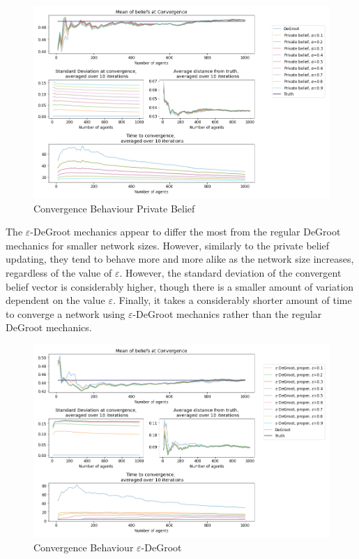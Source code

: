 \documentclass{article}
\begin{document}
\begin{center}
    \begin{figure}[!htbp]
        \centering
        \includegraphics[width=1.2\textwidth]{ThesisKI/Images/WisdomPrivate.png}
        \caption{Convergence Behaviour Private Belief}
        \label{network:noncoop}
    \end{figure}
\end{center}

\newpage

The $\varepsilon$-DeGroot mechanics appear to differ the most from the regular DeGroot mechanics for smaller network sizes. However, similarly to the private belief updating, they tend to behave more and more alike as the network size increases, regardless of the value of $\varepsilon$. However, the standard deviation of the convergent belief vector is considerably higher, though there is a smaller amount of variation dependent on the value $\varepsilon$. Finally, it takes a considerably shorter amount of time to converge a network using $\varepsilon$-DeGroot mechanics rather than the regular DeGroot mechanics. 

\begin{center}
    \begin{figure}[!htbp]
        \centering
        \includegraphics[width=1.2\textwidth]{ThesisKI/Images/WisdomEDeGroot.png}
        \caption{Convergence Behaviour $\varepsilon$-DeGroot}
        \label{network:noncoop}
    \end{figure}
\end{center}
\end{document}
